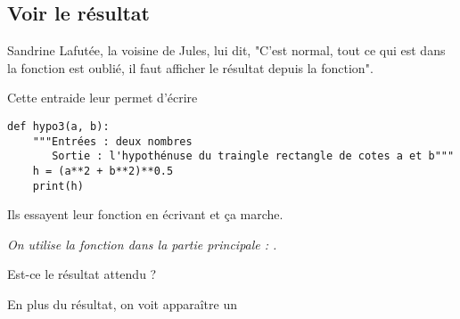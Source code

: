 \subsection{Voir le résultat} 
Sandrine Lafutée, la voisine de Jules, lui dit, "C'est normal, tout ce qui est dans la fonction est oublié, il faut afficher le résultat depuis la fonction".

Cette entraide leur permet d'écrire
\begin{lstlisting}
def hypo3(a, b):
    """Entrées : deux nombres
       Sortie : l'hypothénuse du traingle rectangle de cotes a et b"""
    h = (a**2 + b**2)**0.5
    print(h)
\end{lstlisting}
Ils essayent leur fonction en écrivant  et ça marche.
\begin{Exercise}
\it On utilise la fonction dans la partie principale : .

Est-ce le résultat attendu ?
\end{Exercise}
\begin{Answer}
En plus du résultat, on voit apparaître un 
\end{Answer} 
